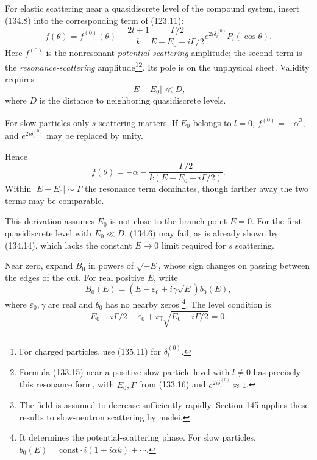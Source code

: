 For elastic scattering near a quasidiscrete level of the compound system,
insert (134.8) into the corresponding term of (123.11):
\begin{equation}
 f(\theta)=f^{(0)}(\theta)-\frac{2l+1}{k}
 \frac{\Gamma/2}{E-E_0+i\Gamma/2}e^{2i\delta_l^{(0)}}P_l(\cos\theta).
 \tag{134.12}
\end{equation}
Here $f^{(0)}$ is the nonresonant \emph{potential-scattering} amplitude; the
second term is the \emph{resonance-scattering} amplitude\footnote{For charged
particles, use (135.11) for $\delta_l^{(0)}$.}\footnote{Formula (133.15) near
a positive slow-particle level with $l\ne0$ has precisely this resonance form,
with $E_0,\Gamma$ from (133.16) and $e^{2i\delta_l^{(0)}}\approx1$.}. Its pole
is on the unphysical sheet. Validity requires
\begin{equation}|E-E_0|\ll D,\tag{134.13}\end{equation}
where $D$ is the distance to neighboring quasidiscrete levels.

For slow particles only $s$ scattering matters. If $E_0$ belongs to $l=0$,
$f^{(0)}=-\alpha$\footnote{The field is assumed to decrease sufficiently
rapidly. Section 145 applies these results to slow-neutron scattering by
nuclei.}, and $e^{2i\delta_0^{(0)}}$ may be replaced by unity.

Hence
\begin{equation}
 f(\theta)=-\alpha-\frac{\Gamma/2}{k(E-E_0+i\Gamma/2)}. \tag{134.14}
\end{equation}
Within $|E-E_0|\sim\Gamma$ the resonance term dominates, though farther away
the two terms may be comparable.

This derivation assumes $E_0$ is not close to the branch point $E=0$. For the
first quasidiscrete level with $E_0\ll D$, (134.6) may fail, as is already
shown by (134.14), which lacks the constant $E\to0$ limit required for
$s$ scattering.

Near zero, expand $B_0$ in powers of $\sqrt{-E}$, whose sign changes on passing
between the edges of the cut. For real positive $E$, write
\begin{equation}
 B_0(E)=(E-\varepsilon_0+i\gamma\sqrt E)b_0(E), \tag{134.15}
\end{equation}
where $\varepsilon_0,\gamma$ are real and $b_0$ has no nearby zeros
\footnote{It determines the potential-scattering phase. For slow particles,
$b_0(E)=\mathrm{const}\cdot i(1+i\alpha k)+\cdots$.}. The level condition is
\begin{equation}
 E_0-i\Gamma/2-\varepsilon_0+i\gamma\sqrt{E_0-i\Gamma/2}=0. \tag{134.16}
\end{equation}

